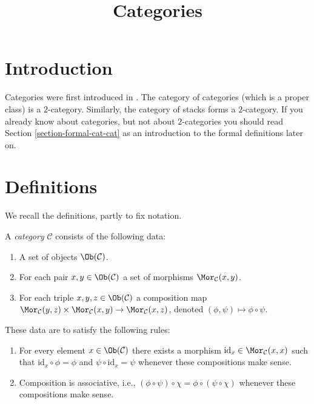 


%


\title{Categories}


\maketitle

\label{section-phantom}

\tableofcontents

\section{Introduction}
\label{section-introduction}

\noindent
Categories were first introduced in \cite{GenEqui}.
The category of categories (which is a proper class)
is a $2$-category. Similarly, the category of stacks
forms a $2$-category. If you already know
about categories, but not about $2$-categories you
should read
Section \ref{section-formal-cat-cat}
as an introduction to the formal definitions later on.

\section{Definitions}
\label{section-definition-categories}

\noindent
We recall the definitions, partly to fix notation.

\begin{definition}
\label{definition-category}
A {\it category} $\mathcal{C}$ consists of the following data:
\begin{enumerate}
\item A set of objects $\Ob(\mathcal{C})$.
\item For each pair $x, y \in \Ob(\mathcal{C})$ a set of morphisms
$\Mor_\mathcal{C}(x, y)$.
\item For each triple $x, y, z\in \Ob(\mathcal{C})$ a composition
map $ \Mor_\mathcal{C}(y, z) \times \Mor_\mathcal{C}(x, y)
\to \Mor_\mathcal{C}(x, z) $, denoted $(\phi, \psi) \mapsto
\phi \circ \psi$.
\end{enumerate}
These data are to satisfy the following rules:
\begin{enumerate}
\item For every element $x\in \Ob(\mathcal{C})$ there exists a
morphism $\text{id}_x\in \Mor_\mathcal{C}(x, x)$ such that
$\text{id}_x \circ \phi = \phi$ and $\psi \circ \text{id}_x = \psi $ whenever
these compositions make sense.
\item Composition is associative, i.e., $(\phi \circ \psi) \circ \chi =
\phi \circ ( \psi \circ \chi)$ whenever these compositions make sense.
\end{enumerate}
\end{definition}

